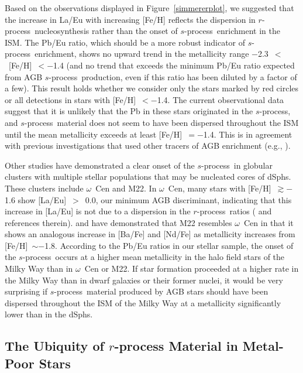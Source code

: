 \documentclass{emulateapj}
\def\rpro{\mbox{$r$-process}}
\def\spro{\mbox{$s$-process}}
\begin{document}
Based on the observations displayed in Figure~\ref{simmererplot}, 
we suggested that the increase in La/Eu
with increasing [Fe/H] reflects the dispersion in \rpro\ nucleosynthesis 
rather than the onset of \spro\ enrichment in the ISM.
The Pb/Eu ratio, which should be a more robust indicator
of \spro\ enrichment, shows no upward trend in the metallicity
range $-$2.3~$<$~[Fe/H]~$< -$1.4 
(and no trend that
exceeds the minimum Pb/Eu ratio expected from AGB \spro\ production,
even if this ratio has been diluted by a factor of a few).
This result holds whether we consider only the stars marked by red circles
or all detections in stars with [Fe/H]~$< -$1.4.
The current observational data suggest 
that it is unlikely that the Pb in these stars
originated in the \spro, and \spro\ material
does not seem to have been dispersed throughout 
the ISM until the mean metallicity exceeds
at least [Fe/H]~$= -$1.4.
This is in agreement with previous investigations 
that used other tracers of AGB enrichment
(e.g., \citealt{melendez07}).

Other studies have demonstrated a clear onset of the \spro\ in 
globular clusters with multiple stellar populations that
may be nucleated cores of dSphs.
These clusters include $\omega$~Cen and M22.
In $\omega$~Cen, many stars with [Fe/H]~$\gtrsim -$1.6 show 
[La/Eu]~$>$~0.0, our minimum AGB discriminant, indicating that
this increase in [La/Eu] is not due to a dispersion
in the \rpro\ ratios 
(\citealt{johnson10} and references therein).
\citet{marino09} and \citet{dacosta09} have demonstrated
that M22 resembles $\omega$~Cen in that it
shows an analogous increase in [Ba/Fe] and [Nd/Fe] 
as metallicity increases from [Fe/H]~$\sim -$1.8.
According to the Pb/Eu ratios in our stellar sample,
the onset of the \spro\ occurs at
a higher mean metallicity in the halo field stars of the Milky Way
than in $\omega$~Cen or M22.
If star formation proceeded at a higher rate in the Milky Way
than in dwarf galaxies or their former nuclei,
it would be very surprising
if \spro\ material produced by AGB stars should have been 
dispersed throughout the ISM
of the Milky Way at a metallicity significantly lower than in the 
dSphs.


\subsection{The Ubiquity of $r$-process Material in Metal-Poor Stars}
\label{enrichment}
\end{document}
